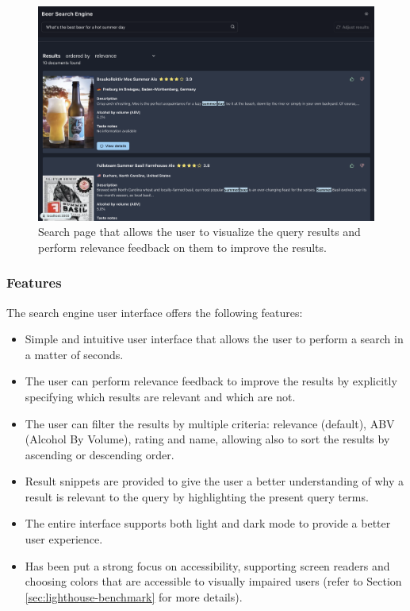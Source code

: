 \begin{figure}[H]
  \centering
  \includegraphics[width=1\textwidth]{img/3_implementation/search-page.png}
  \caption{Search page that allows the user to visualize the query results and perform relevance feedback on them to improve the results.}
  \label{fig:seach-page}
\end{figure}

\subsubsection{Features}

The search engine user interface offers the following features:

\begin{itemize}
  \item Simple and intuitive user interface that allows the user to perform a search in a matter of seconds.
  \item The user can perform relevance feedback to improve the results by explicitly specifying which results are relevant and which are not.
  \item The user can filter the results by multiple criteria: relevance (default), ABV (Alcohol By Volume), rating and name, allowing also to sort the results by ascending or descending order.
  \item Result snippets are provided to give the user a better understanding of why a result is relevant to the query by highlighting the present query terms.
  \item The entire interface supports both light and dark mode to provide a better user experience.
  \item Has been put a strong focus on accessibility, supporting screen readers and choosing colors that are accessible to visually impaired users (refer to Section \ref{sec:lighthouse-benchmark} for more details).
\end{itemize}


